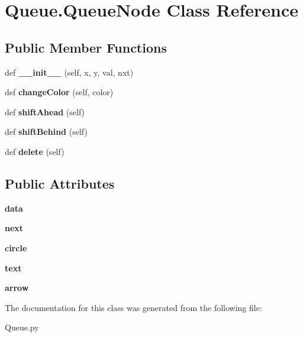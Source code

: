 \hypertarget{class_queue_1_1_queue_node}{}\section{Queue.\+Queue\+Node Class Reference}
\label{class_queue_1_1_queue_node}
\subsection*{Public Member Functions}
\begin{DoxyCompactItemize}
\item 
\mbox{\label{class_queue_1_1_queue_node_acfe34780ae926af46ebe32a58c8e030c}} 
def {\bfseries \+\_\+\+\_\+init\+\_\+\+\_\+} (self, x, y, val, nxt)
\item 
\mbox{\label{class_queue_1_1_queue_node_a97a3e71ba6dddf6a6d40d4222402238b}} 
def {\bfseries change\+Color} (self, color)
\item 
\mbox{\label{class_queue_1_1_queue_node_a71dbaccc8320cb100d14fcf8c8764c83}} 
def {\bfseries shift\+Ahead} (self)
\item 
\mbox{\label{class_queue_1_1_queue_node_ac4f2637c989e8d98c5bf20ce9481dce4}} 
def {\bfseries shift\+Behind} (self)
\item 
\mbox{\label{class_queue_1_1_queue_node_af50c356dd13964a0378e13034eec53ca}} 
def {\bfseries delete} (self)
\end{DoxyCompactItemize}
\subsection*{Public Attributes}
\begin{DoxyCompactItemize}
\item 
\mbox{\label{class_queue_1_1_queue_node_aa9448b7ef31d8dd61adb504ccf7b1c44}} 
{\bfseries data}
\item 
\mbox{\label{class_queue_1_1_queue_node_a736cdbadd2c72609a9964dd149054db0}} 
{\bfseries next}
\item 
\mbox{\label{class_queue_1_1_queue_node_ac113a4d52ea51f0c6fcb65b30e6e0761}} 
{\bfseries circle}
\item 
\mbox{\label{class_queue_1_1_queue_node_a3e732e4728a03dd3c333782519efb320}} 
{\bfseries text}
\item 
\mbox{\label{class_queue_1_1_queue_node_a762acb0de1bf2321d766376c383ffbb0}} 
{\bfseries arrow}
\end{DoxyCompactItemize}


The documentation for this class was generated from the following file\+:\begin{DoxyCompactItemize}
\item 
Queue.\+py\end{DoxyCompactItemize}
